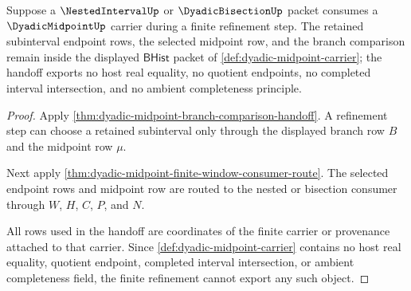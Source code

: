 \begin{theorem}
\label{thm:dyadic-midpoint-nested-interval-non-escape}
Suppose a $\NestedIntervalUp$ or $\DyadicBisectionUp$ packet consumes a $\DyadicMidpointUp$ carrier during a finite refinement step. The retained subinterval endpoint rows, the selected midpoint row, and the branch comparison remain inside the displayed $\mathsf{BHist}$ packet of \autoref{def:dyadic-midpoint-carrier}; the handoff exports no host real equality, no quotient endpoints, no completed interval intersection, and no ambient completeness principle.
\end{theorem}
\begin{proof}
Apply \autoref{thm:dyadic-midpoint-branch-comparison-handoff}. A refinement step can choose a retained subinterval only through the displayed branch row $B$ and the midpoint row $\mu$.

Next apply \autoref{thm:dyadic-midpoint-finite-window-consumer-route}. The selected endpoint rows and midpoint row are routed to the nested or bisection consumer through $W$, $H$, $C$, $P$, and $N$.

All rows used in the handoff are coordinates of the finite carrier or provenance attached to that carrier. Since \autoref{def:dyadic-midpoint-carrier} contains no host real equality, quotient endpoint, completed interval intersection, or ambient completeness field, the finite refinement cannot export any such object.
\end{proof}

